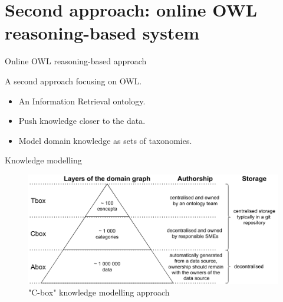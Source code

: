 \section{Second approach: online OWL reasoning-based system}

\begin{frame}{Online OWL reasoning-based approach}

    A second approach focusing on OWL.
    
    \begin{itemize}
        \item An Information Retrieval ontology.
        \item Push knowledge closer to the data.
        \item Model domain knowledge as sets of taxonomies. 
    \end{itemize}

\end{frame}

\begin{frame}{Knowledge modelling}

    \begin{figure} [H]
        \begin{center}
            \includegraphics[scale=0.5]{images/TboxAboxCboxLayers.pdf} 
            \caption{"C-box" knowledge modelling approach} 
        \end{center}
    \end{figure}

\end{frame}

